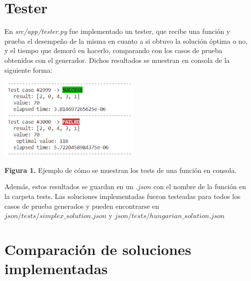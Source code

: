 \documentclass[10pt]{article} %
\begin{document}
	\section{Tester}
	En \textit{src/app/tester.py} fue implementado un tester, que recibe una funci\'on y prueba el desempe\~no de la misma en cuanto a si obtuvo la soluci\'on \'optima o no, y el tiempo que demor\'o en hacerlo, comparando con los casos de prueba obtenidos con el generador. Dichos resultados se muestran en consola de la siguiente forma:
		 \begin{center}
	 		\includegraphics[width=7cm]{tester_sample.png}
	 		
	 		\tiny{\textbf{Figura 1.} Ejemplo de c\'omo se muestran los tests de una funci\'on en consola.} 
	 	\end{center}
	 
	 Adem\'as, estos resultados se guardan en un $ .json $ con el nombre de la funci\'on en la carpeta tests. Las soluciones implementadas fueron testeadas para todos los casos de prueba generados y pueden encontrarse en $ json/tests/simplex\_solution.json $ y $ json/tests/hungarian\_solution.json $
	
	\section{Comparaci\'on de soluciones implementadas}
	
\end{document}
